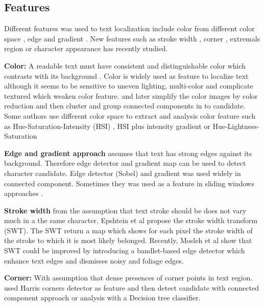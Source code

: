 \subsection{Features}


Different features was used to text localization include color from different color space \cite{yi.2012.TIP} \cite{Roubtsova.2012.SPIE}, edge and gradient \cite{39}. New features such as stroke width \cite{Subramanian.2007.ICDAR} \cite{Epshtein.2010.CVPR} , corner \cite{Zhao.2011.TIP}, extremals region \cite{Neumann.2011.ICDAR} \cite{xucheng.2013.pami} or character appearance \cite{Ye.2014.CBDAR} \cite{Yi.2013.CVIU} has recently studied.


\textbf{Color:} A readable text must have consistent and distinguishable color which contrasts with its background \cite{Liang.2005.IJDAR}. Color is widely used as feature to localize text \cite{Jain.1998.ICPR} \cite{Wang.2003.PR} \cite{Lee.2010.ICPR} although it seems to be sensitive to uneven lighting, multi-color and complicate textured which weaken color feature.
\cite{39} and later \cite{Nikolaou.2009.ISTI} simplify the color images by color reduction and then cluster and group connected components in to candidate. Some authors use different color space to extract and analysis color feature such as Hue-Saturation-Intensity (HSI) \cite{Garcia.2000.ICASSP}, HSI plus intensity gradient \cite{Neumann12} or Hue-Lightness-Saturation \cite{Karatzas.2004.ICPR}


\textbf{Edge and gradient approach} assumes that text has strong edges against its background. Therefore edge detector and gradient map can be used to detect character candidate. Edge detector \cite{Ye.2003.ICICS} (Sobel) \cite{Pillai.2013.ICCPCT} \cite{Shiva.2008.ICPR} and gradient was used widely in connected component. Sometimes they was used as a feature in sliding windows approaches \cite{Chen.2004.CVPR} \cite{Hanif.2008.ICPR}.


\textbf{Stroke width} from the assumption that text stroke should be does not vary much in a the same character, Epshtein et al \cite{Epshtein.2010.CVPR} propose the stroke width transform (SWT). The SWT return a map which shows for each pixel the stroke width of the stroke to which it is most likely belonged. Recently, Mosleh et al \cite{Mosleh.2012.BMVC} show that SWT could be improved by introducing a bandlet-based edge detector which enhance text edges and dismisses noisy and foliage edges.


\textbf{Corner: } With assumption that dense presences of corner points in text region. \cite{Zhao.2011.TIP} \cite{huang.2010.ICPR} used Harris corners detector as feature and then detect candidate with connected component approach \cite{huang.2010.ICPR} or analysis with a Decision tree classifier.


